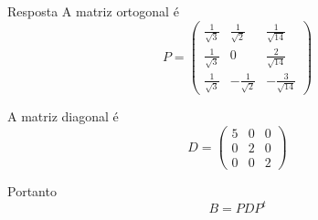 \begin{resolution}{Resposta}
  A matriz ortogonal é
  \[
      P=
      \begin{pmatrix}
          \frac{1}{\sqrt{3}} &
          \frac{1}{\sqrt{2}} &
          \frac{1}{\sqrt{14}}\\
          \frac{1}{\sqrt{3}} &
          0 &
          \frac{2}{\sqrt{14}}\\
          \frac{1}{\sqrt{3}} &
          -\frac{1}{\sqrt{2}} &
          -\frac{3}{\sqrt{14}}
      \end{pmatrix}
  \]

  A matriz diagonal é
  \[
      D=
      \begin{pmatrix}
          5 & 0 & 0\\
          0 & 2 & 0\\
          0 & 0 & 2
      \end{pmatrix}
  \]

  Portanto
  \[
      B=PDP^t
  \]
\end{resolution}

